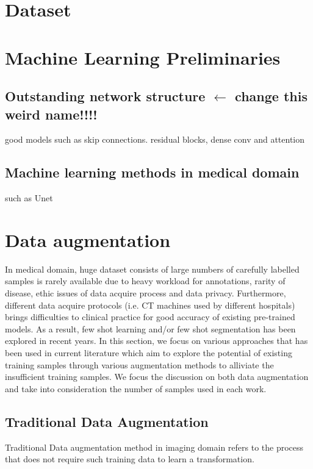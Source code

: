 \section{Dataset}
\section{Machine Learning Preliminaries}
\subsection{Outstanding network structure $\leftarrow$ \textbf{change this weird name!!!!}}
good models such as skip connections. residual blocks, dense conv and attention
\subsection{Machine learning methods in medical domain}
such as Unet
\section{Data augmentation}
In medical domain, huge dataset consists of large numbers of carefully labelled samples is rarely available due to heavy workload for annotations, rarity of disease, ethic issues of data acquire process and data privacy. Furthermore, different data acquire protocols (i.e. CT machines used by different hospitals) brings difficulties to clinical practice for good accuracy of existing pre-trained models. As a result, few shot learning and/or few shot segmentation has been explored in recent years. 
In this section, we focus on various approaches that has been used in current literature which aim to explore the potential of existing training samples through various augmentation methods to alliviate the insufficient training samples. We focus the discussion on both data augmentation and take into consideration the number of samples used in each work.

\subsection{Traditional Data Augmentation}
Traditional Data augmentation method in imaging domain refers to the process that does not require such training data to learn a transformation.\\

